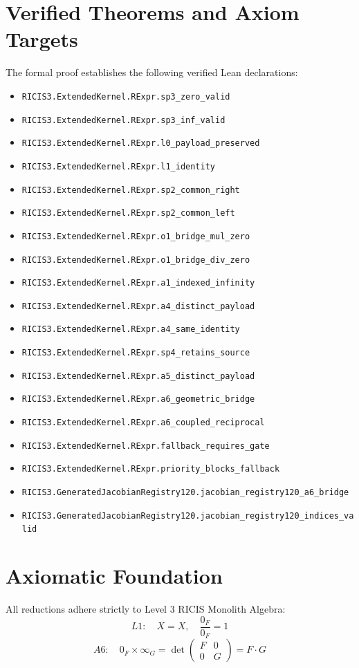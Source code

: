 \documentclass[11pt,a4paper]{article}
\begin{document}
\section{Verified Theorems and Axiom Targets}
The formal proof establishes the following verified Lean declarations:
\begin{itemize}
  \item \texttt{RICIS3.ExtendedKernel.RExpr.sp3_zero_valid}
  \item \texttt{RICIS3.ExtendedKernel.RExpr.sp3_inf_valid}
  \item \texttt{RICIS3.ExtendedKernel.RExpr.l0_payload_preserved}
  \item \texttt{RICIS3.ExtendedKernel.RExpr.l1_identity}
  \item \texttt{RICIS3.ExtendedKernel.RExpr.sp2_common_right}
  \item \texttt{RICIS3.ExtendedKernel.RExpr.sp2_common_left}
  \item \texttt{RICIS3.ExtendedKernel.RExpr.o1_bridge_mul_zero}
  \item \texttt{RICIS3.ExtendedKernel.RExpr.o1_bridge_div_zero}
  \item \texttt{RICIS3.ExtendedKernel.RExpr.a1_indexed_infinity}
  \item \texttt{RICIS3.ExtendedKernel.RExpr.a4_distinct_payload}
  \item \texttt{RICIS3.ExtendedKernel.RExpr.a4_same_identity}
  \item \texttt{RICIS3.ExtendedKernel.RExpr.sp4_retains_source}
  \item \texttt{RICIS3.ExtendedKernel.RExpr.a5_distinct_payload}
  \item \texttt{RICIS3.ExtendedKernel.RExpr.a6_geometric_bridge}
  \item \texttt{RICIS3.ExtendedKernel.RExpr.a6_coupled_reciprocal}
  \item \texttt{RICIS3.ExtendedKernel.RExpr.fallback_requires_gate}
  \item \texttt{RICIS3.ExtendedKernel.RExpr.priority_blocks_fallback}
  \item \texttt{RICIS3.GeneratedJacobianRegistry120.jacobian_registry120_a6_bridge}
  \item \texttt{RICIS3.GeneratedJacobianRegistry120.jacobian_registry120_indices_valid}
\end{itemize}

\section{Axiomatic Foundation}
All reductions adhere strictly to Level 3 RICIS Monolith Algebra:
\begin{equation}
L1: \quad X = X, \quad \frac{0_F}{0_F} = 1
\end{equation}
\begin{equation}
A6: \quad 0_F \times \infty_G = \det\begin{pmatrix} F & 0 \\ 0 & G \end{pmatrix} = F \cdot G
\end{equation}
\end{document}
